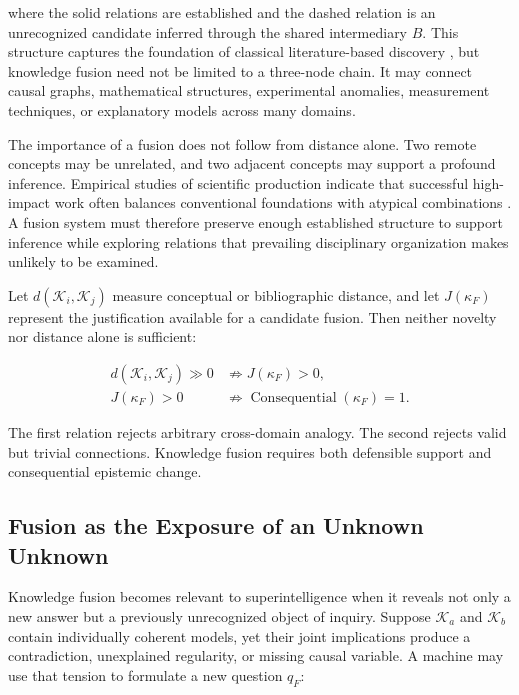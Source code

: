 where the solid relations are established and the dashed relation is an
unrecognized candidate inferred through the shared intermediary $B$. This
structure captures the foundation of classical literature-based discovery
\cite{swanson1986fish}, but knowledge fusion need not be limited to a
three-node chain. It may connect causal graphs, mathematical structures,
experimental anomalies, measurement techniques, or explanatory models across
many domains.

The importance of a fusion does not follow from distance alone. Two remote
concepts may be unrelated, and two adjacent concepts may support a profound
inference. Empirical studies of scientific production indicate that successful
high-impact work often balances conventional foundations with atypical
combinations \cite{uzzi2013atypical}. A fusion system must therefore preserve
enough established structure to support inference while exploring relations
that prevailing disciplinary organization makes unlikely to be examined.

Let $d(\mathcal{K}_{i},\mathcal{K}_{j})$ measure conceptual or bibliographic
distance, and let $J(\kappa_F)$ represent the justification available for a
candidate fusion. Then neither novelty nor distance alone is sufficient:

\begin{equation}
\begin{aligned}
d(\mathcal{K}_{i},\mathcal{K}_{j})\gg 0
&\not\Rightarrow J(\kappa_F)>0,\\
J(\kappa_F)>0
&\not\Rightarrow
\operatorname{Consequential}(\kappa_F)=1.
\end{aligned}
\label{eq:distance_not_fusion}
\end{equation}

The first relation rejects arbitrary cross-domain analogy. The second rejects
valid but trivial connections. Knowledge fusion requires both defensible
support and consequential epistemic change.

\subsection{\textbf{Fusion as the Exposure of an Unknown Unknown}}

Knowledge fusion becomes relevant to superintelligence when it reveals not
only a new answer but a previously unrecognized object of inquiry. Suppose
$\mathcal{K}_{a}$ and $\mathcal{K}_{b}$ contain individually coherent models,
yet their joint implications produce a contradiction, unexplained regularity,
or missing causal variable. A machine may use that tension to formulate a new
question $q_F$:

